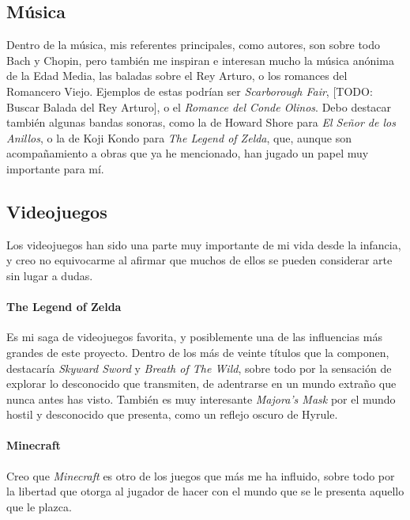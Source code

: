 \hypertarget{muxfasica}{%
\subsection{Música}\label{muxfasica}}

Dentro de la música, mis referentes principales, como autores, son sobre
todo Bach y Chopin, pero también me inspiran e interesan mucho la música
anónima de la Edad Media, las baladas sobre el Rey Arturo, o los
romances del Romancero Viejo. Ejemplos de estas podrían ser
\emph{Scarborough Fair}, {[}TODO: Buscar Balada del Rey Arturo{]}, o el
\emph{Romance del Conde Olinos}. Debo destacar también algunas bandas
sonoras, como la de Howard Shore para \emph{El Señor de los Anillos}, o
la de Koji Kondo para \emph{The Legend of Zelda}, que, aunque son
acompañamiento a obras que ya he mencionado, han jugado un papel muy
importante para mí.

\hypertarget{videojuegos}{%
\subsection{Videojuegos}\label{videojuegos}}

Los videojuegos han sido una parte muy importante de mi vida desde la
infancia, y creo no equivocarme al afirmar que muchos de ellos se pueden
considerar arte sin lugar a dudas.

\hypertarget{the-legend-of-zelda}{%
\paragraph{The Legend of Zelda}\label{the-legend-of-zelda}}

Es mi saga de videojuegos favorita, y posiblemente una de las
influencias más grandes de este proyecto. Dentro de los más de veinte
títulos que la componen, destacaría \emph{Skyward Sword} y \emph{Breath
of The Wild}, sobre todo por la sensación de explorar lo desconocido que
transmiten, de adentrarse en un mundo extraño que nunca antes has visto.
También es muy interesante \emph{Majora's Mask} por el mundo hostil y
desconocido que presenta, como un reflejo oscuro de Hyrule.

\hypertarget{minecraft}{%
\paragraph{Minecraft}\label{minecraft}}

Creo que \emph{Minecraft} es otro de los juegos que más me ha influido,
sobre todo por la libertad que otorga al jugador de hacer con el mundo
que se le presenta aquello que le plazca.

